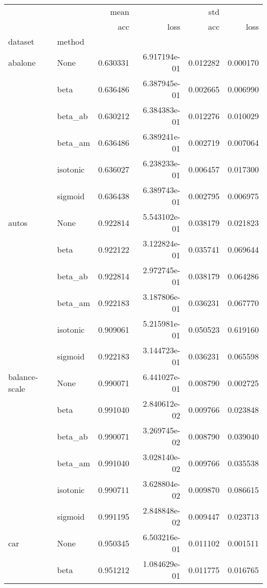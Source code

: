 \begin{tabular}{llrrrr}
\toprule
        &      &      mean &               &       std &           \\
        &      &       acc &          loss &       acc &      loss \\
dataset & method &           &               &           &           \\
\midrule
abalone & None &  0.630331 &  6.917194e-01 &  0.012282 &  0.000170 \\
        & beta &  0.636486 &  6.387945e-01 &  0.002665 &  0.006990 \\
        & beta\_ab &  0.630212 &  6.384383e-01 &  0.012276 &  0.010029 \\
        & beta\_am &  0.636486 &  6.389241e-01 &  0.002719 &  0.007064 \\
        & isotonic &  0.636027 &  6.238233e-01 &  0.006457 &  0.017300 \\
        & sigmoid &  0.636438 &  6.389743e-01 &  0.002795 &  0.006975 \\
autos & None &  0.922814 &  5.543102e-01 &  0.038179 &  0.021823 \\
        & beta &  0.922122 &  3.122824e-01 &  0.035741 &  0.069644 \\
        & beta\_ab &  0.922814 &  2.972745e-01 &  0.038179 &  0.064286 \\
        & beta\_am &  0.922183 &  3.187806e-01 &  0.036231 &  0.067770 \\
        & isotonic &  0.909061 &  5.215981e-01 &  0.050523 &  0.619160 \\
        & sigmoid &  0.922183 &  3.144723e-01 &  0.036231 &  0.065598 \\
balance-scale & None &  0.990071 &  6.441027e-01 &  0.008790 &  0.002725 \\
        & beta &  0.991040 &  2.840612e-02 &  0.009766 &  0.023848 \\
        & beta\_ab &  0.990071 &  3.269745e-02 &  0.008790 &  0.039040 \\
        & beta\_am &  0.991040 &  3.028140e-02 &  0.009766 &  0.035538 \\
        & isotonic &  0.990711 &  3.628804e-02 &  0.009870 &  0.086615 \\
        & sigmoid &  0.991195 &  2.848848e-02 &  0.009447 &  0.023713 \\
car & None &  0.950345 &  6.503216e-01 &  0.011102 &  0.001511 \\
        & beta &  0.951212 &  1.084629e-01 &  0.011775 &  0.016765 \\

\end{tabular}
